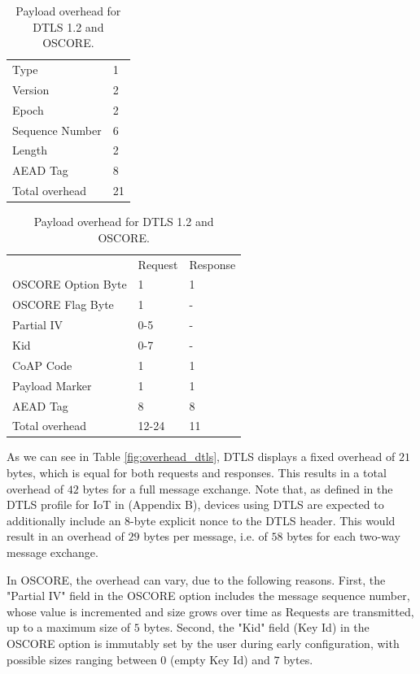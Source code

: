 {\begin{table}[h]
\captionsetup[subtable]{position = below}
\captionsetup[table]{position=top}
\begin{subtable}{0.3\linewidth}
\centering
\begin{tabular}{l|l}
Type    & 1  \\
Version & 2  \\
Epoch           & 2  \\
Sequence Number & 6  \\
Length          & 2  \\
AEAD Tag        & 8  \\ \hline
Total overhead           & 21
\end{tabular}
\caption{Overhead of a DTLS-record layer message (bytes).}
\label{fig:overhead_dtls}
\end{subtable}%
\hspace*{2em}
\begin{subtable}{0.3\linewidth}
\centering
\begin{tabular}{l|l|l}
                     & Request & Response \\
OSCORE Option Byte   & 1    & 1\\
OSCORE Flag Byte     & 1    & -\\
Partial IV           & 0-5  & -\\
Kid                  & 0-7  & -\\
CoAP Code            & 1    & 1\\
Payload Marker       & 1    & 1\\
AEAD Tag             & 8    &  8\\ \hline
Total overhead       & 12-24 & 11
\end{tabular}
\caption{Overhead of an OSCORE message (bytes).}
\label{fig:overhead_oscore}

\end{subtable}
\caption{Payload overhead for DTLS 1.2 and OSCORE.}
\end{table}

As we can see in Table \ref{fig:overhead_dtls}, DTLS displays a fixed overhead of $21$ bytes, which is equal for both requests and responses. This results in a total overhead of $42$ bytes for a full message exchange. Note that, as defined in the DTLS profile for IoT in \cite{rfc7925} (Appendix B), devices using DTLS are expected to additionally include an $8$-byte explicit nonce to the DTLS header. This would result in an overhead of $29$ bytes per message, i.e. of $58$ bytes for each two-way message exchange.

In OSCORE, the overhead can vary, due to the following reasons. First, the "Partial IV" field in the OSCORE option includes the message sequence number, whose value is incremented and size grows over time as Requests are transmitted, up to a maximum size of $5$ bytes. Second, the "Kid" field (Key Id) in the OSCORE option is immutably set by the user during early configuration, with possible sizes ranging between $0$ (empty Key Id) and $7$ bytes. 

}
